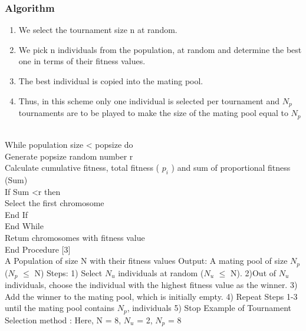 \documentclass{article}
\begin{document}
\subsubsection*{\textbf{Algorithm}}
\begin{enumerate}
    \item We select the tournament size n at random.
    \item We pick n individuals from the population, at random and determine the best one in terms of their fitness values.
    \item The best individual is copied into the mating pool.
    \item Thus, in this scheme only one individual is selected per tournament and $N_p$ tournaments are to be played to make the size of the mating pool equal to $N_p$
\end{enumerate}
\\While population size < popsize do \\
  Generate popsize random number r \\
  Calculate cumulative fitness, total fitness ( $p_i$ ) and sum of proportional fitness (Sum)
 \\
  If Sum <r then \\
  Select the first chromosome \\
  End If \\
  End While \\
  Retum chromosomes with fitness value \\ 
  End Procedure [3] \\
  
A Population of size N with their fitness values Output: A mating pool of size $N_p$ ($N_p$ $\le$ N) 
Steps: 1) Select $N_u$ individuals at random ($N_u$ $\le$ N). 2)Out of $N_u$ individuals, choose the individual with the highest fitness value as the winner. 3) Add the winner to the mating pool, which is initially empty. 4) Repeat Steps 1-3 until the mating pool contains $N_p$, individuals 5) Stop
Example of Tournament Selection method : Here, N = 8, $N_u$ = 2, $N_p$ = 8 
\end{document}
